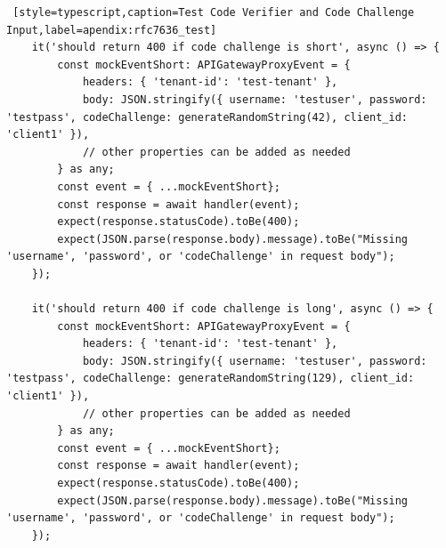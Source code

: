 \begin{lstlisting} [style=typescript,caption=Test Code Verifier and Code Challenge Input,label=apendix:rfc7636_test]
    it('should return 400 if code challenge is short', async () => {
        const mockEventShort: APIGatewayProxyEvent = {
            headers: { 'tenant-id': 'test-tenant' },
            body: JSON.stringify({ username: 'testuser', password: 'testpass', codeChallenge: generateRandomString(42), client_id: 'client1' }),
            // other properties can be added as needed
        } as any;
        const event = { ...mockEventShort};
        const response = await handler(event);
        expect(response.statusCode).toBe(400);
        expect(JSON.parse(response.body).message).toBe("Missing 'username', 'password', or 'codeChallenge' in request body");
    });

    it('should return 400 if code challenge is long', async () => {
        const mockEventShort: APIGatewayProxyEvent = {
            headers: { 'tenant-id': 'test-tenant' },
            body: JSON.stringify({ username: 'testuser', password: 'testpass', codeChallenge: generateRandomString(129), client_id: 'client1' }),
            // other properties can be added as needed
        } as any;
        const event = { ...mockEventShort};
        const response = await handler(event);
        expect(response.statusCode).toBe(400);
        expect(JSON.parse(response.body).message).toBe("Missing 'username', 'password', or 'codeChallenge' in request body");
    });
\end{lstlisting}
    
